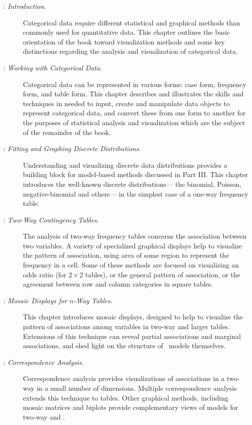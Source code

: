 \begin{description}
\item[: \emph{Introduction}.]
Categorical data require different statistical and graphical methods
than commonly used for quantitative data.
This chapter outlines the basic orientation
of the book toward visualization methods and some key distinctions regarding the
analysis and visualization of categorical data.

\item[: \emph{Working with Categorical Data}.]
Categorical data can be represented in various forms:
case form, frequency form, and table form.  This chapter
describes and illustrates the skills and techniques in \R
needed to input, create and manipulate \R data objects
to represent categorical data, and convert these from one
form to another for the purposes of statistical analysis
and visualization which are the subject of the remainder of the book.

\item[: \emph{Fitting and Graphing Discrete Distributions}.]
Understanding and visualizing discrete data distributions provides a
building block for model-based methods discussed in Part III.
This chapter introduces the well-known discrete distributions---
the binomial, Poisson, negative-binomial and others---
in the simplest case of a one-way frequency table.

\item[: \emph{Two-Way Contingency Tables}.]
The analysis of two-way frequency tables concerns the association
between two variables.  A variety of specialized graphical
displays help to visualize the pattern of association,
using area of some region to represent the frequency in a cell.
Some of these methods are focused
on visualizing an odds ratio (for $2 \times 2$ tables), or the general
pattern of association, or the agreement between row and column
categories in square tables.

\item[: \emph{Mosaic Displays for $n$-Way Tables}.]
This chapter introduces mosaic displays, designed to
help to visualize the pattern of associations
among variables in two-way and larger tables.  
Extensions of
this technique can reveal partial associations and marginal associations,
and shed light on the structure of \loglin\ models themselves.

\item[: \emph{Correspondence Analysis}.]
Correspondence analysis provides visualizations of associations in a two-way \ctab
in a small number of dimensions.
Multiple correspondence analysis extends this technique to \nway
tables.  Other graphical methods, including mosaic matrices and biplots
provide complementary views of \loglin models for two-way and \nway
\ctabs.


\end{description}
